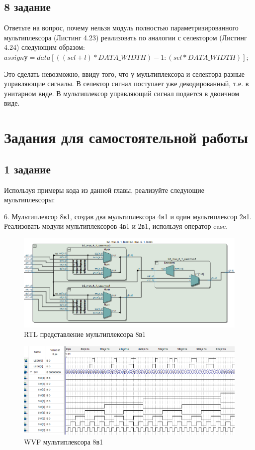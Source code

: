 \documentclass[a4paper,14pt]{article}
\begin{document}
\subsection{8 задание}

Ответьте на вопрос, почему нельзя модуль полностью параметризированного мультиплексора (Листинг 4.23) реализовать по аналогии с селектором (Листинг 4.24) следующим образом: $assign у= data[((sel+l)*DATA\_WIDTH) - 1: (sel*DATA\_WIDTH)]$;

Это сделать невозможно, ввиду того, что у мультиплексора и селектора разные управляющие сигналы. В селектор сигнал поступает уже декодированный, т.е. в унитарном виде. В мультиплексор управляющий сигнал подается в двоичном виде.

\section{Задания для самостоятельной работы}

\subsection{1 задание}

Используя примеры кода из данной главы, реализуйте следующие
мультиплексоры:

6. Мультиплексор 8в1, создав два мультиплексора 4в1 и один мультиплексор 2в1.
Реализовать модули мультиплексоров 4в1 и 2в1, используя оператор case.




\begin{figure}[H]
	\centering
	\includegraphics[width=0.6\linewidth]{img/dop1_rtl}
	\caption{RTL представление мультиплексора 8в1}
	\label{fig:dop1_rtl}
\end{figure}

\begin{figure}[H]
	\centering
	\includegraphics[width=0.6\linewidth]{img/dop1_wvf}
	\caption{WVF  мультиплексора 8в1}
	\label{fig:dop1_wvf}
\end{figure}
  
\end{document}
